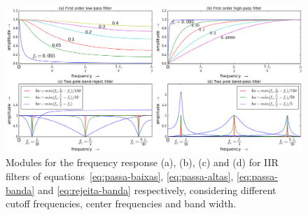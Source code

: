 \begin{figure}
    \centering
        \includegraphics[width=\textwidth]{figures/iir_}
    \caption{Modules for the frequency response (a), (b), (c) and (d) for IIR filters of equations~\ref{eq:passa-baixas}, \ref{eq:passa-altas}, \ref{eq:passa-banda} and \ref{eq:rejeita-banda} respectively, considering different cutoff frequencies, center frequencies and band width.}
        \label{fig:iir}
\end{figure}


